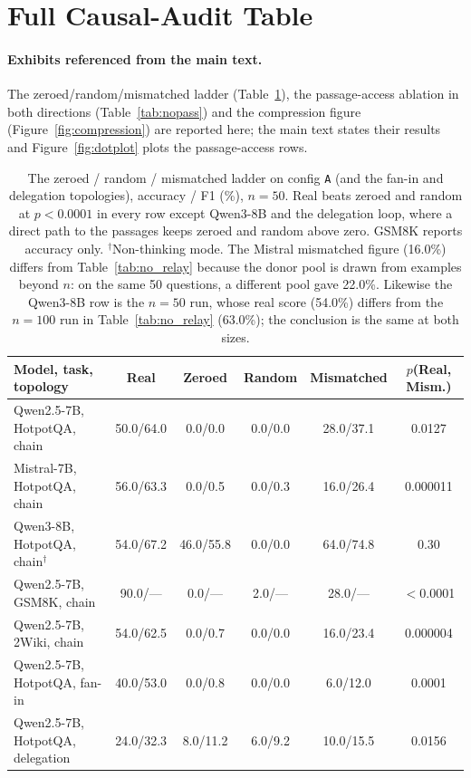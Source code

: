 \documentclass[11pt]{article}
\begin{document}
\section{Full Causal-Audit Table}
\label{app:tables}



\paragraph{Exhibits referenced from the main text.} The zeroed/random/mismatched ladder (Table~\ref{tab:ladder}), the passage-access ablation in both directions (Table~\ref{tab:nopass}) and the compression figure (Figure~\ref{fig:compression}) are reported here; the main text states their results and Figure~\ref{fig:dotplot} plots the passage-access rows.

\begin{table}[h]
\centering
\small
\caption{The zeroed / random / mismatched ladder on config \texttt{A} (and the
fan-in and delegation topologies), accuracy / F1 (\%), $n{=}50$. Real beats
zeroed and random at $p<0.0001$ in every row except Qwen3-8B and the
delegation loop, where a direct path to the passages keeps zeroed and random
above zero. GSM8K reports accuracy only. $^\dagger$Non-thinking mode. The Mistral
mismatched figure (16.0\%) differs from Table~\ref{tab:no_relay} because the donor
pool is drawn from examples beyond $n$: on the same 50 questions, a different pool
gave 22.0\%. Likewise the Qwen3-8B row is the $n{=}50$ run, whose real score
(54.0\%) differs from the $n{=}100$ run in Table~\ref{tab:no_relay} (63.0\%); the
conclusion is the same at both sizes.}
\label{tab:ladder}
\begin{tabular}{lccccc}
\toprule
\textbf{Model, task, topology} & \textcolor{realblue}{\textbf{Real}} & \textbf{Zeroed} & \textbf{Random} & \textcolor{wrongred}{\textbf{Mismatched}} & $p$(Real, Mism.) \\
\midrule
Qwen2.5-7B, HotpotQA, chain       & 50.0/64.0 & 0.0/0.0   & 0.0/0.0 & 28.0/37.1 & 0.0127 \\
Mistral-7B, HotpotQA, chain       & 56.0/63.3 & 0.0/0.5   & 0.0/0.3 & 16.0/26.4 & 0.000011 \\
Qwen3-8B, HotpotQA, chain$^\dagger$ & 54.0/67.2 & 46.0/55.8 & 0.0/0.0 & 64.0/74.8 & 0.30 \\
Qwen2.5-7B, GSM8K, chain          & 90.0/--- & 0.0/---   & 2.0/--- & 28.0/---  & $<$0.0001 \\
Qwen2.5-7B, 2Wiki, chain          & 54.0/62.5 & 0.0/0.7   & 0.0/0.0 & 16.0/23.4 & 0.000004 \\
Qwen2.5-7B, HotpotQA, fan-in      & 40.0/53.0 & 0.0/0.8   & 0.0/0.0 & 6.0/12.0  & 0.0001 \\
Qwen2.5-7B, HotpotQA, delegation  & 24.0/32.3 & 8.0/11.2  & 6.0/9.2 & 10.0/15.5 & 0.0156 \\
\bottomrule
\end{tabular}
\end{table}
\end{document}
